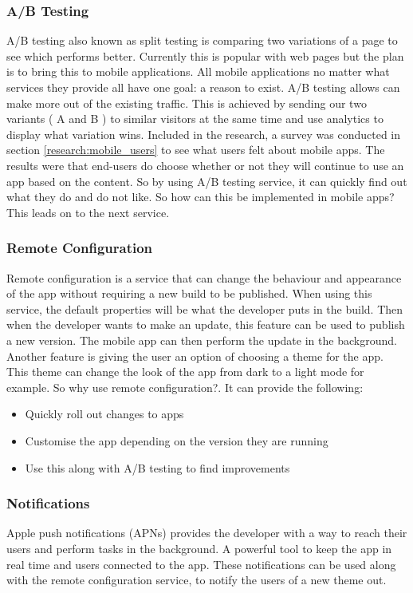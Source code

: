 \subsubsection{A/B Testing} \label{design:abtesting}
A/B testing also known as split testing is comparing two variations of a page to see which performs better. Currently this is popular with web pages but the plan is to bring this to mobile applications. All mobile applications no matter what services they provide all have one goal: a reason to exist. A/B testing allows can make more out of the existing traffic. This is achieved by sending our two variants ( A and B ) to similar visitors at the same time and use analytics to display what variation wins. Included in the research, a survey was conducted in section \ref{research:mobile_users} to see what users felt about mobile apps. The results were that end-users do choose whether or not they will continue to use an app based on the content. So by using A/B testing service, it can quickly find out what they do and do not like. So how can this be implemented in mobile apps? This leads on to the next service.

\subsubsection{Remote Configuration} \label{d-p:remote_config}
Remote configuration is a service that can change the behaviour and appearance of the app without requiring a new build to be published. When using this service, the default properties will be what the developer puts in the build. Then when the developer wants to make an update, this feature can be used to publish a new version. The mobile app can then perform the update in the background. Another feature is giving the user an option of choosing a theme for the app. This theme can change the look of the app from dark to a light mode for example. So why use remote configuration?. It can provide the following:

\begin{itemize}
  \item Quickly roll out changes to apps
  \item Customise the app depending on the version they are running
  \item Use this along with A/B testing to find improvements
\end{itemize}

\subsubsection{Notifications} \label{d-p:notifications}
Apple push notifications (APNs) provides the developer with a way to reach their users and perform tasks in the background. A powerful tool to keep the app in real time and users connected to the app. These notifications can be used along with the remote configuration service, to notify the users of a new theme out.

